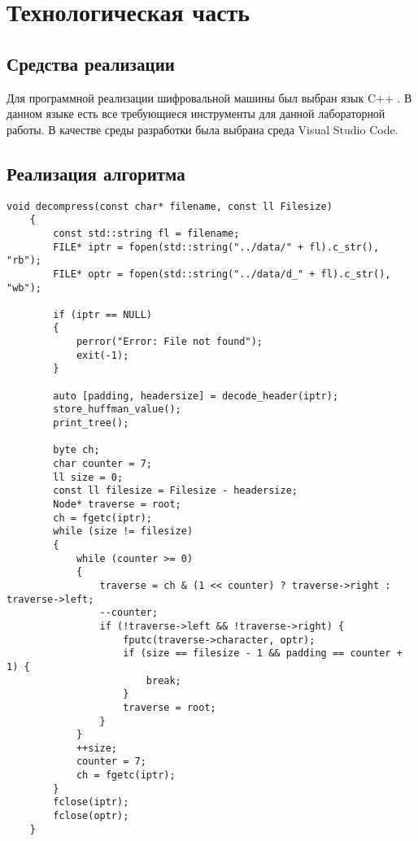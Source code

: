 \chapter{Технологическая часть}

\section{Средства реализации}

Для программной реализации шифровальной машины был выбран язык C++ \cite{cpp}.
В данном языке есть все требующиеся инструменты для данной лабораторной работы.
В качестве среды разработки была выбрана среда Visual Studio Code.

\section{Реализация алгоритма}

\begin{lstlisting}[caption=Алгоритм сжатия файла]
	void decompress(const char* filename, const ll Filesize)
	{
		const std::string fl = filename;
		FILE* iptr = fopen(std::string("../data/" + fl).c_str(), "rb");
		FILE* optr = fopen(std::string("../data/d_" + fl).c_str(), "wb");
		
		if (iptr == NULL)
		{
			perror("Error: File not found");
			exit(-1);
		}
		
		auto [padding, headersize] = decode_header(iptr);
		store_huffman_value();
		print_tree();
		
		byte ch;
		char counter = 7;
		ll size = 0;
		const ll filesize = Filesize - headersize;
		Node* traverse = root;
		ch = fgetc(iptr);
		while (size != filesize)
		{
			while (counter >= 0)
			{
				traverse = ch & (1 << counter) ? traverse->right : traverse->left;
				--counter;
				if (!traverse->left && !traverse->right) {
					fputc(traverse->character, optr);
					if (size == filesize - 1 && padding == counter + 1) {
						break;
					}
					traverse = root;
				}
			}
			++size;
			counter = 7;
			ch = fgetc(iptr);
		}
		fclose(iptr);
		fclose(optr);
	}
\end{lstlisting}

